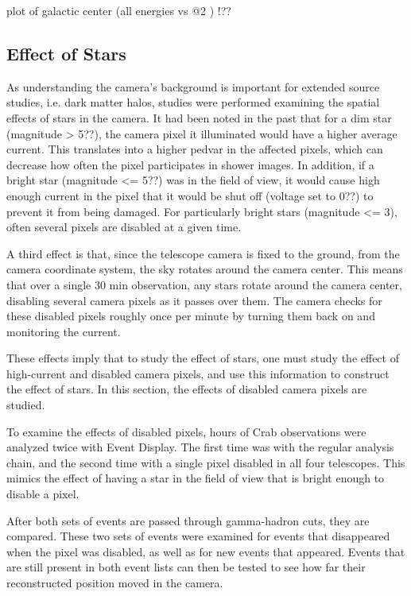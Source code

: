 plot of galactic center (all energies vs @2 \TeV ) !??

\subsection{Effect of Stars}
As understanding the camera's background is important for extended source studies, i.e. dark matter halos, studies were performed examining the spatial effects of stars in the camera.
It had been noted in the past that for a dim star (magnitude > 5??), the camera pixel it illuminated would have a higher average current.
This translates into a higher pedvar in the affected pixels, which can decrease how often the pixel participates in shower images.
In addition, if a bright star (magnitude <= 5??) was in the field of view, it would cause high enough current in the pixel that it would be shut off (voltage set to 0??) to prevent it from being damaged.
For particularly bright stars (magnitude <= 3), often several pixels are disabled at a given time.

A third effect is that, since the telescope camera is fixed to the ground, from the camera coordinate system, the sky rotates around the camera center.
This means that over a single 30 min observation, any stars rotate around the camera center, disabling several camera pixels as it passes over them.
The camera checks for these disabled pixels roughly once per minute by turning them back on and monitoring the current.

These effects imply that to study the effect of stars, one must study the effect of high-current and disabled camera pixels, and use this information to construct the effect of stars.
In this section, the effects of disabled camera pixels are studied.

To examine the effects of disabled pixels,  hours of Crab observations were analyzed twice with Event Display.
The first time was with the regular analysis chain, and the second time with a single pixel disabled in all four telescopes.
This mimics the effect of having a star in the field of view that is bright enough to disable a pixel.

After both sets of events are passed through gamma-hadron cuts, they are compared.
These two sets of events were examined for events that disappeared when the pixel was disabled, as well as for new events that appeared.
Events that are still present in both event lists can then be tested to see how far their reconstructed position moved in the camera.

